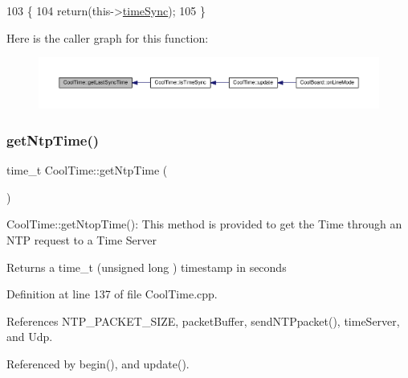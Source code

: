 \begin{DoxyCode}
103 \{
104     \textcolor{keywordflow}{return}(this->\hyperlink{classCoolTime_a9d032e76c3470a15b3bbbc52af6463f7}{timeSync});
105 \}
\end{DoxyCode}
Here is the caller graph for this function\+:
\nopagebreak
\begin{figure}[H]
\begin{center}
\leavevmode
\includegraphics[width=350pt]{classCoolTime_a5d17f707a9d337720493b2bce9d41c21_icgraph}
\end{center}
\end{figure}
\mbox{\label{classCoolTime_a41fbbbfd651c2079f54d4b2911e4c705}} 
\subsubsection{\texorpdfstring{get\+Ntp\+Time()}{getNtpTime()}}
{\footnotesize\ttfamily time\+\_\+t Cool\+Time\+::get\+Ntp\+Time (\begin{DoxyParamCaption}{ }\end{DoxyParamCaption})}

Cool\+Time\+::get\+Ntop\+Time()\+: This method is provided to get the Time through an N\+TP request to a Time Server

\begin{DoxyReturn}{Returns}
a time\+\_\+t (unsigned long ) timestamp in seconds 
\end{DoxyReturn}


Definition at line 137 of file Cool\+Time.\+cpp.



References N\+T\+P\+\_\+\+P\+A\+C\+K\+E\+T\+\_\+\+S\+I\+ZE, packet\+Buffer, send\+N\+T\+Ppacket(), time\+Server, and Udp.



Referenced by begin(), and update().


